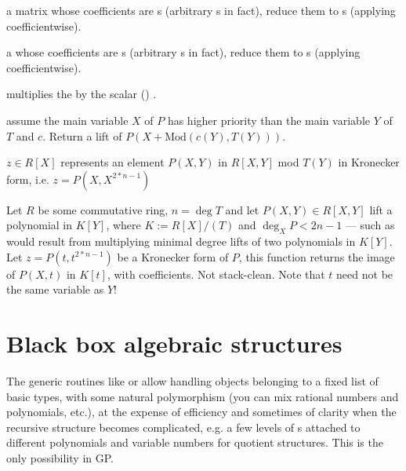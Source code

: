 
  a matrix whose
coefficients are s (arbitrary s in fact), reduce them to
s (applying  coefficientwise).



  a  whose
coefficients are s (arbitrary s in fact), reduce them to
s (applying  coefficientwise).


 multiplies the 
 by the scalar () .






 assume the main variable
$X$ of $P$ has higher priority than the main variable $Y$ of $T$ and $c$.
Return a lift of $P(X+\text{Mod}(c(Y), T(Y)))$.

 $z\in R[X]$ represents an element
$P(X,Y)$ in $R[X,Y]$ mod $T(Y)$ in Kronecker form, i.e. $z = P(X,X^{2*n-1})$

Let $R$ be some commutative ring, $n = \deg T$ and let $P(X,Y)\in R[X,Y]$ lift
a polynomial in $K[Y]$, where $K := R[X]/(T)$ and $\deg_X P < 2n-1$ --- such as
would result from multiplying minimal degree lifts of two polynomials in
$K[Y]$. Let $z = P(t,t^{2*n-1})$ be a Kronecker form of $P$, this function
returns the image of $P(X,t)$ in $K[t]$, with  coefficients.
Not stack-clean. Note that $t$ need not be the same variable as $Y$!

\chapter{Black box algebraic structures}

The generic routines like  or  allow handling objects
belonging to a fixed list of basic types, with some natural polymorphism
(you can mix rational numbers and polynomials, etc.), at the expense of
efficiency and sometimes of clarity when the recursive structure becomes
complicated, e.g. a few levels of s attached to different
polynomials and variable numbers for quotient structures. This
is the only possibility in GP.


